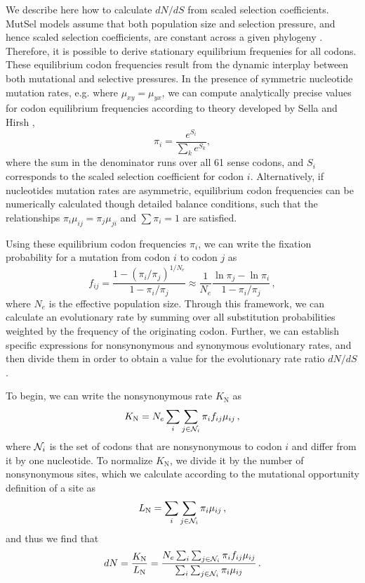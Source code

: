 \documentclass[11pt]{article}
\begin{document}
We describe here how to calculate $dN/dS$ from scaled selection coefficients. MutSel models assume that both population size and selection pressure, and hence scaled selection coefficients, are constant across a given phylogeny \cite{HalpernBruno1998,YangNielsen2009,Rodrigueetal2010,Tamurietal2014}. Therefore, it is possible to derive stationary equilibrium frequenies for all codons. These equilibrium codon frequencies result from the dynamic interplay between both mutational and selective pressures. In the presence of symmetric nucleotide mutation rates, e.g. where $\mu_{xy} = \mu_{yx}$, we can compute analytically precise values for codon equilibrium frequencies according to theory developed by Sella and Hirsh \cite{SellaHirsh2005}, \begin{equation} \pi_i=\frac{e^{S_i}}{\sum_k e^{S_k}}, \end{equation} where the sum in the denominator runs over all 61 sense codons, and $S_i$ corresponds to the scaled selection coefficient for codon $i$. Alternatively, if nucleotides mutation rates are asymmetric, equilibrium codon frequencies can be numerically calculated though detailed balance conditions, such that the relationships 
 $\pi_i\mu_{ij} = \pi_j\mu_{ji}$ and $\sum\pi_i = 1$ are satisfied.
 
Using these equilibrium codon frequencies $\pi_i$, we can write the fixation probability for a mutation from codon $i$ to codon $j$ as \cite{HalpernBruno1998,SellaHirsh2005}
\begin{equation}\label{eq:f_ij}
 f_{ij} = \frac{1-(\pi_i/\pi_j)^{1/N_e}}{1-\pi_i/\pi_j}
  \approx \frac{1}{N_e} \frac{\ln \pi_j - \ln \pi_i}{1-\pi_i/\pi_j}\,,
\end{equation}
where $N_e$ is the effective population size. Through this framework, we can calculate an evolutionary rate by summing over all substitution probabilities weighted by the frequency of the originating codon. Further, we can establish specific expressions for nonsynonymous and synonymous evolutionary rates, and then divide them in order to obtain a value for the evolutionary rate ratio $dN/dS$.

To begin, we can write the nonsynonymous rate $K_\text{N}$ as 
\begin{equation}\label{eq:KN}
  K_\text{N} = N_e \sum_i \sum_{j \in {\cal N}_i} \pi_i  f_{ij}\mu_{ij}\,,
\end{equation}
where ${\cal N}_i$ is the set of codons that are nonsynonymous to codon $i$ and differ from it by one nucleotide. To normalize $K_\text{N}$, we divide it by the number of nonsynonymous sites, which we calculate according to the mutational opportunity definition of a site \cite{GoldmanYang1994, Yang2006} as 
\begin{equation}\label{eq:LN}
  L_\text{N} = \sum_i \sum_{j \in {\cal N}_i} \pi_i \mu_{ij}\,, 
\end{equation} and thus we find that 
\begin{equation}\label{eq:dN}
  dN = \frac{K_\text{N}}{L_\text{N}}=\frac{ N_e \sum_i \sum_{j \in {\cal N}_i} \pi_i f_{ij} \mu_{ij} } {\sum_i \sum_{j \in {\cal N}_i} \pi_i \mu_{ij} }\,.
\end{equation}
\end{document}
